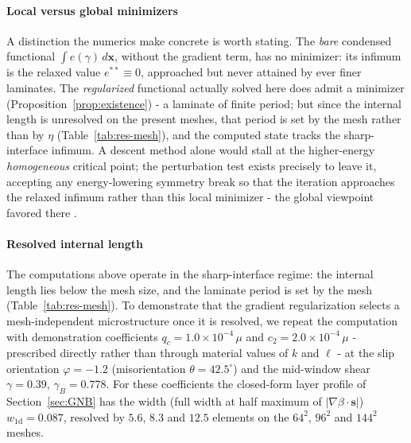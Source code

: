 \documentclass[12pt]{article}
\theoremstyle{plain}
\theoremstyle{definition}
\newcommand{\bs}{\bm{s}}
\newcommand{\bx}{\bm{x}}
\begin{document}
\paragraph{Local versus global minimizers} A distinction the numerics make
concrete is worth stating. The \emph{bare} condensed functional $\int
e(\gamma)\,d\bx$, without the gradient term, has no minimizer: its infimum is the
relaxed value $e^{\ast\ast}\equiv0$, approached but never attained by ever finer
laminates. The \emph{regularized} functional actually solved here does admit a
minimizer (Proposition~\ref{prop:existence}) - a laminate of finite period; but since the internal length is unresolved on the present meshes, that period is set by the mesh rather than by $\eta$ (Table~\ref{tab:res-mesh}), and the computed state tracks the sharp-interface infimum. A descent method alone would stall at the higher-energy \emph{homogeneous} critical point; the perturbation test exists precisely to
leave it, accepting any energy-lowering symmetry break so that the iteration
approaches the relaxed infimum rather than this local minimizer - the global
viewpoint favored there \citep{kumar2020assessment}.

\paragraph{Resolved internal length}
The computations above operate in the sharp-interface regime: the internal
length lies below the mesh size, and the laminate period is set by the mesh
(Table~\ref{tab:res-mesh}). To demonstrate that the gradient regularization
selects a mesh-independent microstructure once it is resolved, we repeat the
computation with demonstration coefficients $q_c=1.0\times10^{-4}\,\mu$ and
$c_2=2.0\times10^{-4}\,\mu$ - prescribed directly rather than through material
values of $k$ and $\ell$ - at the slip orientation $\varphi=-1.2$
(misorientation $\theta=42.5^{\circ}$) and the mid-window shear $\gamma=0.39$,
$\gamma_B=0.778$. For these coefficients the closed-form layer profile of
Section~\ref{sec:GNB} has the width (full width at half maximum of
$|\nabla\beta\cdot\bs|$) $w_{\mathrm{1d}}=0.087$, resolved by $5.6$, $8.3$ and
$12.5$ elements on the $64^{2}$, $96^{2}$ and $144^{2}$ meshes.
\end{document}
